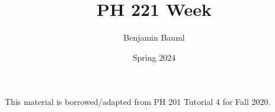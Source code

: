 \documentclass[]{article}
\title{PH 221 Week \Week}
\author{Benjamin Bauml}
\date{Spring 2024}
\newcommand{\FileDepth}{../../..}
\begin{document}
\maketitle
\begin{center}
	This material is borrowed/adapted from PH 201 Tutorial 4 for Fall 2020.
\end{center}




\end{document}
